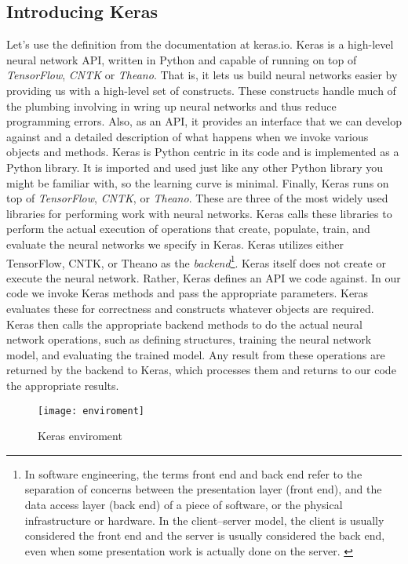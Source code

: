 \subsection{Introducing Keras}
\label{sec:introduction_keras}
Let's use the definition from the documentation at keras.io.
Keras is a high-level neural network API, written in Python and capable of
running on top of \emph{TensorFlow}, \emph{CNTK} or 
\emph{Theano}.\cite{chollet2015keras}
That is, it lets us build neural networks easier by providing us with a
high-level set of constructs.
These constructs handle much of the plumbing involving in wring up neural
networks and thus reduce programming errors.
Also, as an API, it provides an interface that we can develop against and a
detailed description of what happens when we invoke various objects and methods.
Keras is Python centric in its code and is implemented as a Python library.
It is imported and used just like any other Python library you might be familiar
with, so the learning curve is minimal.
Finally, Keras runs on top of \emph{TensorFlow}, \emph{CNTK}, or \emph{Theano}.
These are three of the most widely used libraries for performing work with
neural networks.
Keras calls these libraries to perform the actual execution of operations that
create, populate, train, and evaluate the neural networks we specify in Keras.
Keras utilizes either TensorFlow, CNTK, or Theano as the 
\emph{backend}\footnote{In software engineering, the terms front end and back 
end refer to the separation of concerns between the presentation layer (front 
end), and the data access layer (back end) of a piece of software, or the 
physical infrastructure or hardware. In the client--server model, the client 
is usually considered the front end and the server is usually considered the 
back end, even when some presentation work is actually done on the server.
\cite{backend}}.
Keras itself does not create or execute the neural network.
Rather, Keras defines an API we code against. 
In our code we invoke Keras methods and pass the appropriate parameters.
Keras evaluates these for correctness and constructs whatever objects are
required.
Keras then calls the appropriate backend methods to do the actual neural 
network operations, such as defining structures, training the neural network 
model, and evaluating the trained model. Any result from these operations are 
returned by the backend to Keras, which processes them and returns to our code 
the appropriate results.
%
\begin{figure}[!h]
\centering
\texttt{[image: enviroment]}
\caption{Keras enviroment}
\label{fig:nn_layer}
\end{figure}
%
